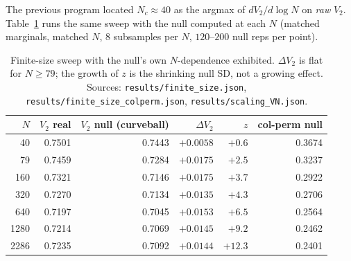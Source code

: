 \documentclass[11pt,a4paper]{article}
\theoremstyle{plain}
\theoremstyle{remark}
\theoremstyle{plain}
\begin{document}
The previous program located $N_c\approx40$ as the argmax of $dV_2/d\log N$ on \emph{raw} $V_2$. Table~\ref{tab:finitesize} runs the same sweep with the null computed at each $N$ (matched marginals, matched $N$, $8$ subsamples per $N$, $120$--$200$ null reps per point).

\begin{table}[h]
\centering
\small
\begin{tabular}{rrrrrr}
\toprule
$N$ & $V_2$ real & $V_2$ null (curveball) & $\Delta V_2$ & $z$ & col-perm null \\
\midrule
40   & 0.7501 & 0.7443 & $+0.0058$ & $+0.6$ & 0.3674 \\
79   & 0.7459 & 0.7284 & $+0.0175$ & $+2.5$ & 0.3237 \\
160  & 0.7321 & 0.7146 & $+0.0175$ & $+3.7$ & 0.2922 \\
320  & 0.7270 & 0.7134 & $+0.0135$ & $+4.3$ & 0.2706 \\
640  & 0.7197 & 0.7045 & $+0.0153$ & $+6.5$ & 0.2564 \\
1280 & 0.7214 & 0.7069 & $+0.0145$ & $+9.2$ & 0.2462 \\
2286 & 0.7235 & 0.7092 & $+0.0144$ & $+12.3$ & 0.2401 \\
\bottomrule
\end{tabular}
\caption{Finite-size sweep with the null's own $N$-dependence exhibited. $\Delta V_2$ is flat for $N\ge79$; the growth of $z$ is the shrinking null SD, not a growing effect. Sources: \texttt{results/finite\_size.json}, \texttt{results/finite\_size\_colperm.json}, \texttt{results/scaling\_VN.json}.}
\label{tab:finitesize}
\end{table}
\end{document}
